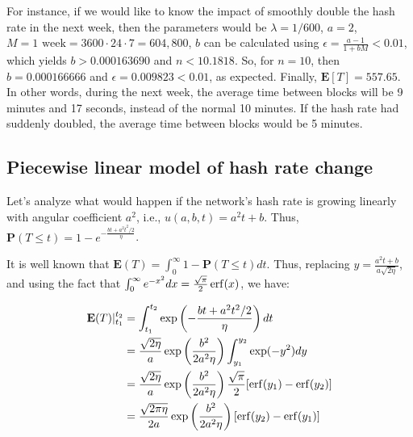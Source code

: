 For instance, if we would like to know the impact of smoothly double the hash rate in the next week, then the parameters would be $\lambda = 1/600$, $a=2$, $M=1\text{ week}=3600\cdot24\cdot7 = 604,800$, $b$ can be calculated using $\epsilon = \frac{a-1}{1+bM} < 0.01$, which yields $b > 0.000163690$ and $n < 10.1818$. So, for $n=10$, then $b=0.000166666$ and $\epsilon = 0.009823 < 0.01$, as expected. Finally, $\mathbf{E}[T] = 557.65$. In other words, during the next week, the average time between blocks will be 9 minutes and 17 seconds, instead of the normal 10 minutes. If the hash rate had suddenly doubled, the average time between blocks would be 5 minutes.





\subsection{Piecewise linear model of hash rate change}

Let's analyze what would happen if the network's hash rate is growing linearly with angular coefficient $a^2$, i.e., $u(a, b, t) = a^2t + b$. Thus, $\mathbf{P}(T \leq t) = 1 - e^{-\frac{bt + a^2t^2/2}{\eta}}$.

It is well known that $\mathbf{E}(T) = \int_{0}^{\infty} 1 - \mathbf{P}(T \leq t) dt$. Thus, replacing $y = \frac{a^2 t + b}{a \sqrt{2 \eta}}$, and using the fact that $\int_0^\infty e^{-x^2} dx = \frac{\sqrt{\pi}}{2} \operatorname{erf}(x)$, we have:

\begin{align}
\mathbf{E}(T)|_{t_1}^{t_2} &= \int_{t_1}^{t_2} \exp \left( - \frac{bt + a^2 t^2/2}{\eta} \right) dt \nonumber \\
	&= \frac{\sqrt{2 \eta}}{a} \exp \left( \frac{b^2}{2a^2 \eta} \right) \int_{y_1}^{y_2}  \exp(-y^2) dy \nonumber \\
	&= \frac{\sqrt{2 \eta}}{a} \exp \left( \frac{b^2}{2a^2 \eta} \right) \frac{\sqrt{\pi}}{2} [\operatorname{erf}(y_1) - \operatorname{erf}(y_2)] \nonumber \\
	&= \frac{\sqrt{2 \pi \eta}}{2a} \exp \left( \frac{b^2}{2a^2 \eta} \right) \left[\operatorname{erf}(y_2) - \operatorname{erf}(y_1) \right]
\end{align}

